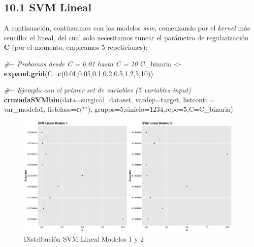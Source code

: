 \documentclass[
]{article}
\newenvironment{Shaded}{\begin{snugshade}}{\end{snugshade}}
\newcommand{\CommentTok}[1]{\textcolor[rgb]{0.56,0.35,0.01}{\textit{#1}}}
\newcommand{\DataTypeTok}[1]{\textcolor[rgb]{0.13,0.29,0.53}{#1}}
\newcommand{\DecValTok}[1]{\textcolor[rgb]{0.00,0.00,0.81}{#1}}
\newcommand{\FloatTok}[1]{\textcolor[rgb]{0.00,0.00,0.81}{#1}}
\newcommand{\KeywordTok}[1]{\textcolor[rgb]{0.13,0.29,0.53}{\textbf{#1}}}
\newcommand{\NormalTok}[1]{#1}
\newcommand{\StringTok}[1]{\textcolor[rgb]{0.31,0.60,0.02}{#1}}
\begin{document}
\hypertarget{svm-lineal}{%
\subsection{10.1 SVM Lineal}\label{svm-lineal}}

A continuación, continuamos con los modelos \emph{svm}, comenzando por
el \emph{kernel} más sencillo: el lineal, del cual solo necesitamos
tunear el parámetro de regularización \textbf{C} (por el momento,
empleamos 5 repeticiones):

\begin{Shaded}
\begin{Highlighting}[]
\CommentTok{\#{-}{-} Probamos desde C = 0.01 hasta C = 10}
\NormalTok{C\_binaria <{-}}\StringTok{ }\KeywordTok{expand.grid}\NormalTok{(}\DataTypeTok{C=}\KeywordTok{c}\NormalTok{(}\FloatTok{0.01}\NormalTok{,}\FloatTok{0.05}\NormalTok{,}\FloatTok{0.1}\NormalTok{,}\FloatTok{0.2}\NormalTok{,}\FloatTok{0.5}\NormalTok{,}\DecValTok{1}\NormalTok{,}\DecValTok{2}\NormalTok{,}\DecValTok{5}\NormalTok{,}\DecValTok{10}\NormalTok{))}

\CommentTok{\#{-}{-} Ejemplo con el primer set de variables (5 variables input)}
\KeywordTok{cruzadaSVMbin}\NormalTok{(}\DataTypeTok{data=}\NormalTok{surgical\_dataset, }\DataTypeTok{vardep=}\NormalTok{target,}
                           \DataTypeTok{listconti =}\NormalTok{ var\_modelo1, }\DataTypeTok{listclass=}\KeywordTok{c}\NormalTok{(}\StringTok{""}\NormalTok{),}
                           \DataTypeTok{grupos=}\DecValTok{5}\NormalTok{,}\DataTypeTok{sinicio=}\DecValTok{1234}\NormalTok{,}\DataTypeTok{repe=}\DecValTok{5}\NormalTok{,}\DataTypeTok{C=}\NormalTok{C\_binaria)}
\end{Highlighting}
\end{Shaded}

\begin{figure}[h!]

{\centering \includegraphics[width=0.99\linewidth,height=0.99\textheight,]{./charts/SVM/06_svm_lineal_modelo1_2} 

}

\caption{Distribución SVM Lineal Modelos 1 y 2}\label{fig:unnamed-chunk-116}
\end{figure}
\end{document}
